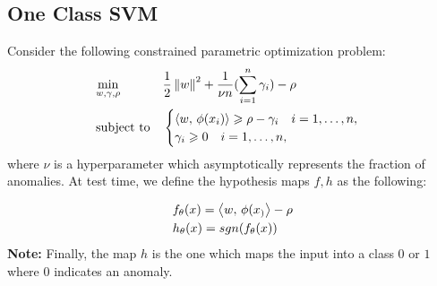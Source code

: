 \documentclass[11pt]{report}
\begin{document}
\subsection{One Class SVM}
Consider the following constrained parametric optimization problem:
\begin{align}
        \label{appen:nlmpp}
        \begin{aligned}
            &\operatorname*{min}_{w,\gamma,\rho}  && \frac{1}{2}\left\lVert w \right\rVert^2+\frac{1}{\nu n}(\sum_{i=1}^{n}\gamma_{i})  - \rho\\
            &\operatorname{subject\,\,to} && \begin{cases}
            \left\langle{w},\,{\phi(x_i)}\right\rangle \geqslant \rho - \gamma_i \quad i=1,\ldots,n,\\
           \gamma_i \geqslant 0 \quad i=1,\ldots,n,
            \end{cases}
        \end{aligned} \nonumber
    \end{align}
where \(\nu\) is a hyperparameter which asymptotically represents the fraction of anomalies.
\vspace{1mm}
At test time, we define the hypothesis maps \(f,h\) as the following:

\begin{align}
        \begin{aligned}
            & f_\theta(x)=\left\langle{w},\,{\phi(x_)}\right\rangle - \rho\\
            & h_\theta(x)=sgn(f_\theta(x))
        \end{aligned} \nonumber
    \end{align}
\textbf{Note:} Finally, the map \(h\) is the one which maps the input into a class \(0\) or \(1\) where 0 indicates an anomaly.
\end{document}
